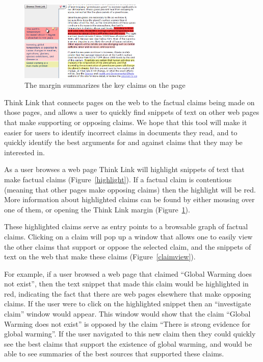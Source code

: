 \documentclass{chi2009}
\begin{document}
\begin{figure}[tb]
	\begin{center}
	\includegraphics[width=6cm]{../screenshots/sidebar_crop.png}
	\caption{The margin summarizes the key claims on the page}
	\label{margin}
	\end{center}
\end{figure}

Think Link that connects pages on the web to the factual claims being made on those pages, and allows a user to quickly find snippets of text on other web pages that make supporting or opposing claims. We hope that this tool will make it easier for users to identify incorrect claims in documents they read, and to quickly identify the best arguments for and against claims that they may be interested in.

As a user browses a web page Think Link will highlight snippets of text that make factual claims (Figure~\ref{highlight}). If a factual claim is contentious (meaning that other pages make opposing claims) then the highlight will be red. More information about highlighted claims can be found by either mousing over one of them, or opening the Think Link margin (Figure~\ref{margin}).

These highlighted claims serve as entry points to a browsable graph of factual claims. Clicking on a claim will pop up a window that allows one to easily view the other claims that support or oppose the selected claim, and the snippets of text on the web that make these claims (Figure~\ref{claimview}).

For example, if a user browsed a web page that claimed ``Global Warming does not exist'', then the text snippet that made this claim would be highlighted in red, indicating the fact that there are web pages elsewhere that make opposing claims. If the user were to click on the highlighted snippet then an ``investigate claim'' window would appear. This window would show that the claim ``Global Warming does not exist'' is opposed by the claim ``There is strong evidence for global warming''. If the user navigated to this new claim then they could quickly see the best claims that support the existence of global warming, and would be able to see summaries of the best sources that supported these claims.
\end{document}
